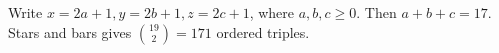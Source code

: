 Write $x=2a+1,y=2b+1,z=2c+1$, where $a,b,c\ge0$. Then $a+b+c=17$. Stars and bars gives $\binom{19}{2}=\boxed{171}$ ordered triples.
